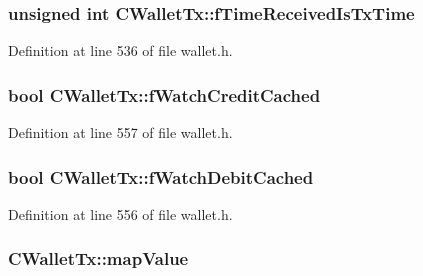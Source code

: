 \subsubsection[{f\+Time\+Received\+Is\+Tx\+Time}]{\setlength{\rightskip}{0pt plus 5cm}unsigned int C\+Wallet\+Tx\+::f\+Time\+Received\+Is\+Tx\+Time}\label{class_c_wallet_tx_ac058c61be3a1c680a3ad384ff04d27eb}


Definition at line 536 of file wallet.\+h.

\hypertarget{class_c_wallet_tx_abbe2fa89b594fd1c931572bdf7b7a4cd}{}
\subsubsection[{f\+Watch\+Credit\+Cached}]{\setlength{\rightskip}{0pt plus 5cm}bool C\+Wallet\+Tx\+::f\+Watch\+Credit\+Cached\hspace{0.3cm}{\ttfamily [mutable]}}\label{class_c_wallet_tx_abbe2fa89b594fd1c931572bdf7b7a4cd}


Definition at line 557 of file wallet.\+h.

\hypertarget{class_c_wallet_tx_a803d33ac2e13c964a2778bd575f5c69c}{}
\subsubsection[{f\+Watch\+Debit\+Cached}]{\setlength{\rightskip}{0pt plus 5cm}bool C\+Wallet\+Tx\+::f\+Watch\+Debit\+Cached\hspace{0.3cm}{\ttfamily [mutable]}}\label{class_c_wallet_tx_a803d33ac2e13c964a2778bd575f5c69c}


Definition at line 556 of file wallet.\+h.

\hypertarget{class_c_wallet_tx_a17229eca0c81245312115a9c333203d8}{}
\subsubsection[{map\+Value}]{ C\+Wallet\+Tx\+::map\+Value}\label{class_c_wallet_tx_a17229eca0c81245312115a9c333203d8}


